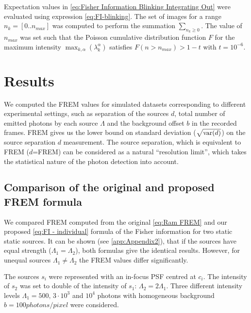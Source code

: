 Expectation values in \autoref{eq:Fisher Information Blinking Integrating Out} were evaluated using expression \autoref{eq:FI-blinking}. The set of images for a range $n_k=[0..n_{max}]$ was computed to perform the summation $\sum_{n_k\geq0}$. The value of $n_{max}$ was set such that the Poisson cumulative distribution function $F$ for the maximum intensity $\max_{k,\alpha}(\lambda_k^\alpha)$ satisfies $F(n>n_{max})>1-t$ with $t=10^{-6}$.


\clearpage
\section{Results\label{sec:FREM results}}

We computed the FREM values for simulated datasets corresponding to different experimental settings, such as separation of the sources $d$, total number of emitted photons by each source $\Lambda$ and the background offset $b$ in the recorded frames. FREM gives us the lower bound on standard deviation ($\sqrt{\mathrm{var}(d)}$) on the source separation $d$ measurement. The source separation, which is equivalent to FREM ($d$=FREM) can be considered as a natural ``resolution limit'', which takes the statistical nature of the photon detection into account.

\subsection{Comparison of the original and proposed FREM formula\label{sec:comparison orig and new FREM}}
%
We compared FREM computed from the original \autoref{eq:Ram FREM} and our proposed \autoref{eq:FI - individual} formula of the Fisher information for two static static sources. It can be shown (see \autoref{app:Appendix2}), that if the sources have equal strength ($\Lambda_1=\Lambda_2$), both formulas give the identical results. However, for unequal sources $\Lambda_1\neq\Lambda_2$ the FREM values differ significantly. 

The sources $s_i$ were represented with an in-focus PSF centred at $c_i$. The intensity of $s_2$ was set to double of the intensity of $s_1$: $\Lambda_2=2\Lambda_1$. Three different intensity levels $\Lambda_1=500,\,3\cdot 10^3$ and $10^4$ photons with homogeneous background $b=100\unit{photons/pixel}$ were considered. 


